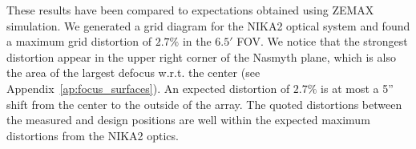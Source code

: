 These results have been compared to expectations obtained using ZEMAX
simulation. 
%
%
%
%
We generated a grid diagram for the NIKA2 optical system and found a maximum
grid distortion of $2.7\%$ in the $6.5'$ FOV. We notice that the
strongest distortion appear in the upper right corner of the Nasmyth plane, which is
also the area of the largest defocus w.r.t. the center (see Appendix~\ref{ap:focus_surfaces}).
An expected distortion of $2.7\%$ is at most a 5'' shift from the
center to the outside of the array. The quoted distortions between the
measured and design positions are well within the expected
maximum distortions from the NIKA2 optics.



